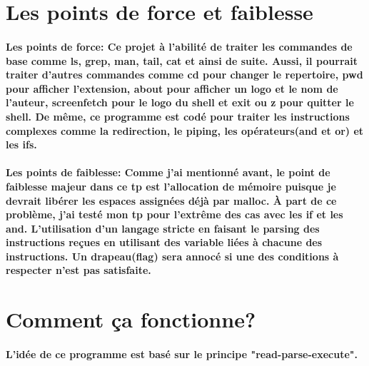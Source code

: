 \documentclass{article}
\begin{document}
\section{Les points de force et faiblesse}
\paragraph{Les points de force: Ce projet à l'abilité de traiter les commandes de base comme ls, grep, man, tail, cat et ainsi de suite. Aussi, il pourrait traiter d'autres commandes comme cd pour changer le repertoire, pwd pour afficher l'extension, about pour afficher un logo et le nom de l'auteur, screenfetch pour le logo du shell et exit ou z pour quitter le shell. De même, ce programme est codé pour traiter les instructions complexes comme la redirection, le piping, les opérateurs(and et or) et les ifs.}

\paragraph*{Les points de faiblesse: Comme j'ai mentionné avant, le point de faiblesse majeur dans ce tp est l'allocation de mémoire puisque je devrait libérer les espaces assignées déjà par malloc. À part de ce problème, j'ai testé mon tp pour l'extrême des cas avec les if et les and. L'utilisation d'un langage stricte en faisant le parsing des instructions reçues en utilisant des variable liées à chacune des instructions. Un drapeau(flag) sera annocé si une des conditions à respecter n'est pas satisfaite.}

\section{Comment ça fonctionne?}
\paragraph{L'idée de ce programme est basé sur le principe "read-parse-execute".}
\end{document}
